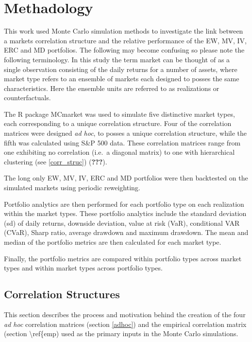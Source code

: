 \documentclass[11pt,preprint, authoryear]{elsarticle}
\numberwithin{equation}{section}
\numberwithin{figure}{section}
\numberwithin{table}{section}
\begin{document}
\hypertarget{methadology}{%
\section{Methadology}\label{methadology}}

This work used Monte Carlo simulation methods to investigate the link
between a markets correlation structure and the relative performance of
the EW, MV, IV, ERC and MD portfolios. The following may become
confusing so please note the following terminology. In this study the
term market can be thought of as a single observation consisting of the
daily returns for a number of assets, where market type refers to an
ensemble of markets each designed to posses the same characteristics.
Here the ensemble units are referred to as realizations or
counterfactuals.

The R package MCmarket was used to simulate five distinctive market
types, each corresponding to a unique correlation structure. Four of the
correlation matrices were designed \emph{ad hoc}, to posses a unique
correlation structure, while the fifth was calculated using S\&P 500
data. These correlation matrices range from one exhibiting no
correlation (i.e.~a diagonal matrix) to one with hierarchical clustering
(see \ref{corr_struc}) ({\textbf{???}}).

The long only EW, MV, IV, ERC and MD portfolios were then backtested on
the simulated markets using periodic reweighting.

Portfolio analytics are then performed for each portfolio type on each
realization within the market types. These portfolio analytics include
the standard deviation (sd) of daily returns, downside deviation, value
at risk (VaR), conditional VAR (CVaR), Sharp ratio, average drawdown and
maximum drawdown. The mean and median of the portfolio metrics are then
calculated for each market type.

Finally, the portfolio metrics are compared within portfolio types
across market types and within market types across portfolio types.

\hypertarget{correlation-structures}{%
\subsection{\texorpdfstring{Correlation Structures
\label{corr_struc}}{Correlation Structures }}\label{correlation-structures}}

This section describes the process and motivation behind the creation of
the four \emph{ad hoc} correlation matrices (section \ref{adhoc}) and
the empirical correlation matrix (section \textbackslash ref\{emp) used
as the primary inputs in the Monte Carlo simulations.
\end{document}
